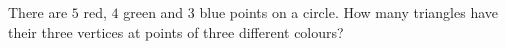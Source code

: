 There are $5$ red, $4$ green and $3$ blue points on a circle. How many triangles have their three vertices at points of three different colours?
